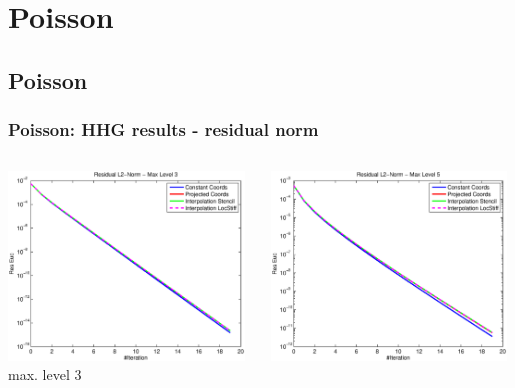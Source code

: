 \documentclass[t,compress=false,usepdftitle=false]{beamer}
\begin{document}
%
%
%

\section{Poisson}
\subsection{Poisson}


\begin{frame}\frametitle{Poisson: HHG results - residual norm}

\begin{columns}[T] 
\begin{column}[T]{4.3cm} 
  \centering
  \includegraphics[width=0.98\textwidth]{spherepoisson_resEuc_level3}\\
  max. level 3
\end{column}\hfill
\begin{column}[T]{4.3cm} 
  \centering
  \includegraphics[width=0.98\textwidth]{spherepoisson_resEuc_level5}\\

\end{column}
\end{columns}
\end{frame}
\end{document}
